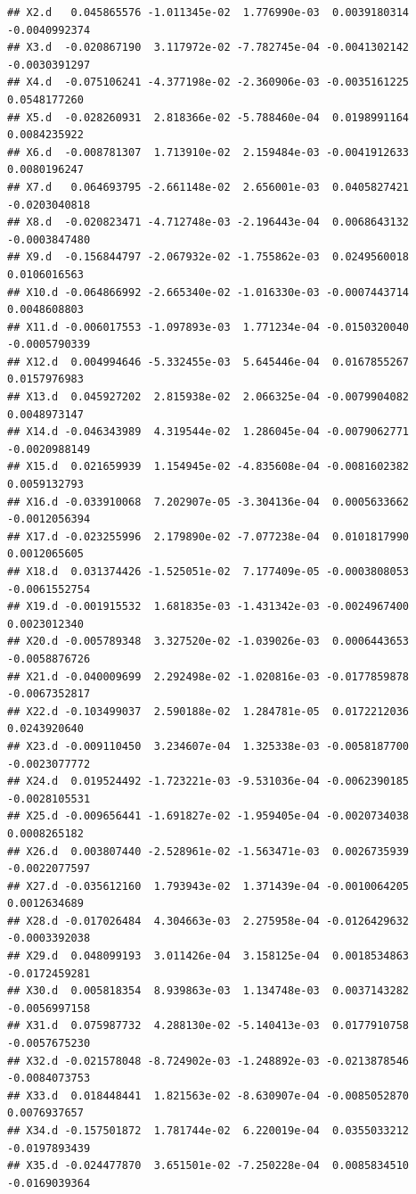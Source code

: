 \documentclass[]{article}
\begin{document}
\begin{verbatim}
## X2.d   0.045865576 -1.011345e-02  1.776990e-03  0.0039180314 -0.0040992374
## X3.d  -0.020867190  3.117972e-02 -7.782745e-04 -0.0041302142 -0.0030391297
## X4.d  -0.075106241 -4.377198e-02 -2.360906e-03 -0.0035161225  0.0548177260
## X5.d  -0.028260931  2.818366e-02 -5.788460e-04  0.0198991164  0.0084235922
## X6.d  -0.008781307  1.713910e-02  2.159484e-03 -0.0041912633  0.0080196247
## X7.d   0.064693795 -2.661148e-02  2.656001e-03  0.0405827421 -0.0203040818
## X8.d  -0.020823471 -4.712748e-03 -2.196443e-04  0.0068643132 -0.0003847480
## X9.d  -0.156844797 -2.067932e-02 -1.755862e-03  0.0249560018  0.0106016563
## X10.d -0.064866992 -2.665340e-02 -1.016330e-03 -0.0007443714  0.0048608803
## X11.d -0.006017553 -1.097893e-03  1.771234e-04 -0.0150320040 -0.0005790339
## X12.d  0.004994646 -5.332455e-03  5.645446e-04  0.0167855267  0.0157976983
## X13.d  0.045927202  2.815938e-02  2.066325e-04 -0.0079904082  0.0048973147
## X14.d -0.046343989  4.319544e-02  1.286045e-04 -0.0079062771 -0.0020988149
## X15.d  0.021659939  1.154945e-02 -4.835608e-04 -0.0081602382  0.0059132793
## X16.d -0.033910068  7.202907e-05 -3.304136e-04  0.0005633662 -0.0012056394
## X17.d -0.023255996  2.179890e-02 -7.077238e-04  0.0101817990  0.0012065605
## X18.d  0.031374426 -1.525051e-02  7.177409e-05 -0.0003808053 -0.0061552754
## X19.d -0.001915532  1.681835e-03 -1.431342e-03 -0.0024967400  0.0023012340
## X20.d -0.005789348  3.327520e-02 -1.039026e-03  0.0006443653 -0.0058876726
## X21.d -0.040009699  2.292498e-02 -1.020816e-03 -0.0177859878 -0.0067352817
## X22.d -0.103499037  2.590188e-02  1.284781e-05  0.0172212036  0.0243920640
## X23.d -0.009110450  3.234607e-04  1.325338e-03 -0.0058187700 -0.0023077772
## X24.d  0.019524492 -1.723221e-03 -9.531036e-04 -0.0062390185 -0.0028105531
## X25.d -0.009656441 -1.691827e-02 -1.959405e-04 -0.0020734038  0.0008265182
## X26.d  0.003807440 -2.528961e-02 -1.563471e-03  0.0026735939 -0.0022077597
## X27.d -0.035612160  1.793943e-02  1.371439e-04 -0.0010064205  0.0012634689
## X28.d -0.017026484  4.304663e-03  2.275958e-04 -0.0126429632 -0.0003392038
## X29.d  0.048099193  3.011426e-04  3.158125e-04  0.0018534863 -0.0172459281
## X30.d  0.005818354  8.939863e-03  1.134748e-03  0.0037143282 -0.0056997158
## X31.d  0.075987732  4.288130e-02 -5.140413e-03  0.0177910758 -0.0057675230
## X32.d -0.021578048 -8.724902e-03 -1.248892e-03 -0.0213878546 -0.0084073753
## X33.d  0.018448441  1.821563e-02 -8.630907e-04 -0.0085052870  0.0076937657
## X34.d -0.157501872  1.781744e-02  6.220019e-04  0.0355033212 -0.0197893439
## X35.d -0.024477870  3.651501e-02 -7.250228e-04  0.0085834510 -0.0169039364

\end{verbatim}
\end{document}
